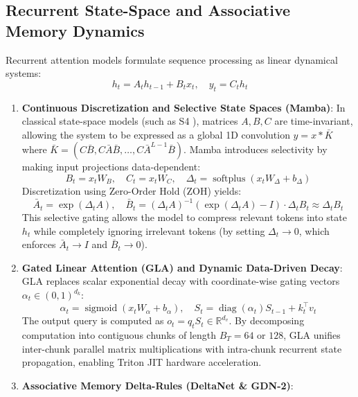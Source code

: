 \documentclass{article}
\begin{document}
\subsection{Recurrent State-Space and Associative Memory Dynamics}
Recurrent attention models formulate sequence processing as linear dynamical systems:
\begin{equation}
    h_t = A_t h_{t-1} + B_t x_t, \quad y_t = C_t h_t
\end{equation}
\begin{enumerate}
    \item \textbf{Continuous Discretization and Selective State Spaces (Mamba)}:
    In classical state-space models (such as S4 \citep{gu2021efficiently}), matrices $A, B, C$ are time-invariant, allowing the system to be expressed as a global 1D convolution $y = x * \bar{K}$ where $\bar{K} = (C \bar{B}, C \bar{A} \bar{B}, \dots, C \bar{A}^{L-1} \bar{B})$. Mamba \citep{gu2022mamba} introduces selectivity by making input projections data-dependent:
    \begin{equation}
        B_t = x_t W_B, \quad C_t = x_t W_C, \quad \Delta_t = \operatorname{softplus}(x_t W_\Delta + b_\Delta)
    \end{equation}
    Discretization using Zero-Order Hold (ZOH) yields:
    \begin{equation}
        \bar{A}_t = \exp(\Delta_t A), \quad \bar{B}_t = (\Delta_t A)^{-1}(\exp(\Delta_t A) - I) \cdot \Delta_t B_t \approx \Delta_t B_t
    \end{equation}
    This selective gating allows the model to compress relevant tokens into state $h_t$ while completely ignoring irrelevant tokens (by setting $\Delta_t \to 0$, which enforces $\bar{A}_t \to I$ and $\bar{B}_t \to 0$).
    \item \textbf{Gated Linear Attention (GLA) and Dynamic Data-Driven Decay}:
    GLA \citep{yang2023gated} replaces scalar exponential decay with coordinate-wise gating vectors $\alpha_t \in (0, 1)^{d_k}$:
    \begin{equation}
        \alpha_t = \operatorname{sigmoid}(x_t W_\alpha + b_\alpha), \quad S_t = \operatorname{diag}(\alpha_t) S_{t-1} + k_t^\top v_t
    \end{equation}
    The output query is computed as $o_t = q_t S_t \in \mathbb{R}^{d_v}$. By decomposing computation into contiguous chunks of length $B_T = 64$ or $128$, GLA unifies inter-chunk parallel matrix multiplications with intra-chunk recurrent state propagation, enabling Triton JIT hardware acceleration.
    \item \textbf{Associative Memory Delta-Rules (DeltaNet \& GDN-2)}:

\end{enumerate}
\end{document}
